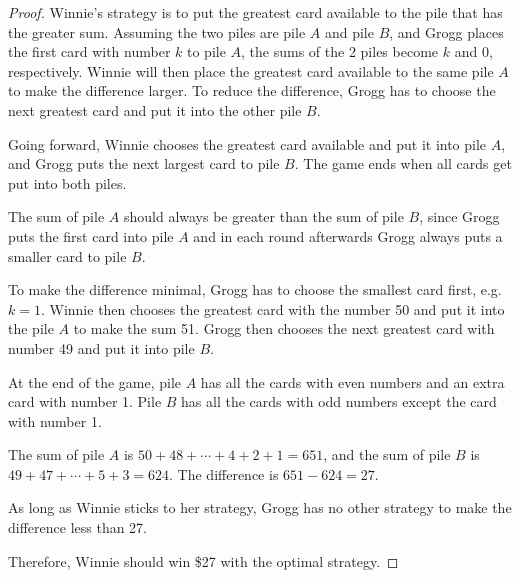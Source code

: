 \documentclass[11pt, oneside]{article}   	%
\begin{document}
\begin{proof}
Winnie's strategy is to put the greatest card available to the pile that has the greater sum. Assuming the two piles are pile $A$ and pile $B$, and  Grogg places the first card with number $k$ to pile $A$, the sums of the 2 piles become $k$ and $0$, respectively. Winnie will then place the greatest card available to the same pile $A$ to make the difference larger. To reduce the difference, Grogg has to choose the next greatest card and put it into the other pile $B$. 

Going forward, Winnie chooses the greatest card available and put it into pile $A$, and Grogg puts the next largest card to pile $B$. The game ends when all cards get put into both piles. 

The sum of pile $A$ should always be greater than the sum of pile $B$, since Grogg puts the first card into pile $A$ and in each round afterwards Grogg always puts a smaller card to pile $B$.

To make the difference minimal, Grogg has to choose the smallest card first, e.g. $k=1$. Winnie then chooses  the greatest card with the number 50 and put it into the pile $A$  to make the sum 51. Grogg then chooses the next greatest card with number 49 and put it into pile $B$.

At the end of the game, pile $A$ has all the cards with even numbers and an extra card with number 1. Pile $B$ has all the cards with odd numbers except the card with number 1.

The sum of pile $A$ is $50+48+\cdots +4+2+1=651$, and the sum of pile $B$ is $49+47+\cdots +5+3=624$. The difference is $651-624=27$.

As long as Winnie sticks to her strategy, Grogg has no other strategy to make the difference less than 27.

Therefore, Winnie should win \$27 with the optimal strategy.
\end{proof}
\end{document}
